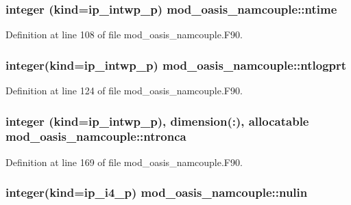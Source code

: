 \hypertarget{classmod__oasis__namcouple_a8a962108487c3ca092633bd4292dbfd6}{
\subsubsection[{ntime}]{\setlength{\rightskip}{0pt plus 5cm}integer (kind=ip\+\_\+intwp\+\_\+p) mod\+\_\+oasis\+\_\+namcouple\+::ntime\hspace{0.3cm}{\ttfamily [private]}}}\label{classmod__oasis__namcouple_a8a962108487c3ca092633bd4292dbfd6}


Definition at line 108 of file mod\+\_\+oasis\+\_\+namcouple.\+F90.

\hypertarget{classmod__oasis__namcouple_a49bd874b06648257f7ce70da19a678b4}{
\subsubsection[{ntlogprt}]{\setlength{\rightskip}{0pt plus 5cm}integer(kind=ip\+\_\+intwp\+\_\+p) mod\+\_\+oasis\+\_\+namcouple\+::ntlogprt\hspace{0.3cm}{\ttfamily [private]}}}\label{classmod__oasis__namcouple_a49bd874b06648257f7ce70da19a678b4}


Definition at line 124 of file mod\+\_\+oasis\+\_\+namcouple.\+F90.

\hypertarget{classmod__oasis__namcouple_aaf9fd5eaa5d115f2548b8f78cdcd172d}{
\subsubsection[{ntronca}]{\setlength{\rightskip}{0pt plus 5cm}integer (kind=ip\+\_\+intwp\+\_\+p), dimension(\+:), allocatable mod\+\_\+oasis\+\_\+namcouple\+::ntronca\hspace{0.3cm}{\ttfamily [private]}}}\label{classmod__oasis__namcouple_aaf9fd5eaa5d115f2548b8f78cdcd172d}


Definition at line 169 of file mod\+\_\+oasis\+\_\+namcouple.\+F90.

\hypertarget{classmod__oasis__namcouple_a36ef9483c332254e38c52b1d78d26f1f}{
\subsubsection[{nulin}]{\setlength{\rightskip}{0pt plus 5cm}integer(kind=ip\+\_\+i4\+\_\+p) mod\+\_\+oasis\+\_\+namcouple\+::nulin\hspace{0.3cm}{\ttfamily [private]}}}\label{classmod__oasis__namcouple_a36ef9483c332254e38c52b1d78d26f1f}


